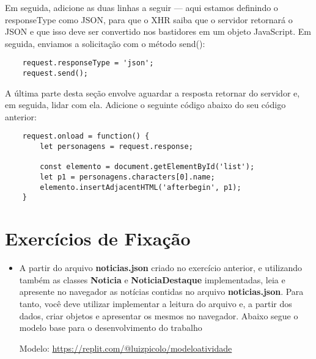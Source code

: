 Em seguida, adicione as duas linhas a seguir — aqui estamos definindo o  responseType como JSON, para que o XHR saiba que o servidor retornará o JSON e que isso deve ser convertido nos bastidores em um objeto JavaScript. Em seguida, enviamos a solicitação com o método send():

\begin{lstlisting}
	request.responseType = 'json';
	request.send();
\end{lstlisting}

A última parte desta seção envolve aguardar a resposta retornar do servidor e, em seguida, lidar com ela. Adicione o seguinte código abaixo do seu código anterior:

\begin{lstlisting}
	request.onload = function() {
		let personagens = request.response;
		
		const elemento = document.getElementById('list');
		let p1 = personagens.characters[0].name;
		elemento.insertAdjacentHTML('afterbegin', p1);
	}
\end{lstlisting}

\section{Exercícios de Fixação}

\begin{itemize}
	\item A partir do arquivo \textbf{noticias.json} criado no exercício anterior, e utilizando também as classes \textbf{Noticia} e \textbf{NoticiaDestaque} implementadas, leia e apresente no navegador as notícias contidas no arquivo \textbf{noticias.json}. Para tanto, você deve utilizar implementar a leitura do arquivo e, a partir dos dados, criar objetos e apresentar os mesmos no navegador. Abaixo segue o modelo base para o desenvolvimento do trabalho
	
	
	Modelo: \url{https://replit.com/@luizpicolo/modeloatividade}
\end{itemize}